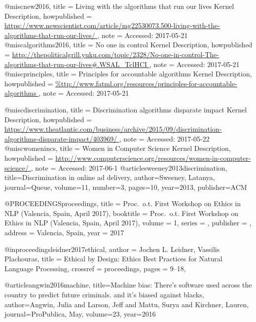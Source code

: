 
@misc{new2016,
  title = {{Living with the algorithms that run our lives} Kernel Description},
  howpublished = {\url{https://www.newscientist.com/article/mg22530073.500-living-with-the-algorithms-that-run-our-lives/
}},
  note = {Accessed: 2017-05-21}
}
@misc{algorithms2016,
  title = {{No one in control} Kernel Description},
  howpublished = {\url{http://thepoliticalgrill.yuku.com/topic/2328/No-one-in-control-The-algorithms-that-run-our-lives#.WSAL_TclHCI
}},
  note = {Accessed: 2017-05-21}
}
@misc{principles,
  title = {{Principles for accountable algorithms} Kernel Description},
  howpublished = {\url{%
}},
  note = {Accessed: 2017-05-21}
}

@misc{discrimination,
  title = {{Discrimination algorithms disparate impact} Kernel Description},
  howpublished = {\url{https://www.theatlantic.com/business/archive/2015/09/discrimination-algorithms-disparate-impact/403969/
}},
  note = {Accessed: 2017-05-22}
}
@misc{womenincs,
  title = {{Women in Computer Science} Kernel Description},
  howpublished = {\url{http://www.computerscience.org/resources/women-in-computer-science/
}},
  note = {Accessed: 2017-06-1}
}
@article{sweeney2013discrimination,
  title={Discrimination in online ad delivery},
  author={Sweeney, Latanya},
  journal={Queue},
  volume={11},
  number={3},
  pages={10},
  year={2013},
  publisher={ACM}
}

@PROCEEDINGS{proceedings,
  title = {Proc.\ o.t. First Workshop on Ethics in NLP
      (Valencia, Spain, April 2017)},
  booktitle = {Proc.\ o.t. First Workshop on Ethics in NLP
      (Valencia, Spain, April 2017)},
  volume = 1,
  series = {},
  publisher = {},
  address = {Valencia, Spain},
  year = {2017}
}

@inproceedings{leidner2017ethical,
  author =       {Jochen L. Leidner, Vassilis Plachouras},
  title =        {Ethical by Design: Ethics Best Practices for Natural Language Processing},
  crossref =     {proceedings},
  pages =        {9--18},
}

@article{angwin2016machine,
  title={Machine bias: There’s software used across the country to predict future criminals. and it’s biased against blacks},
  author={Angwin, Julia and Larson, Jeff and Mattu, Surya and Kirchner, Lauren},
  journal={ProPublica, May},
  volume={23},
  year={2016}
}



